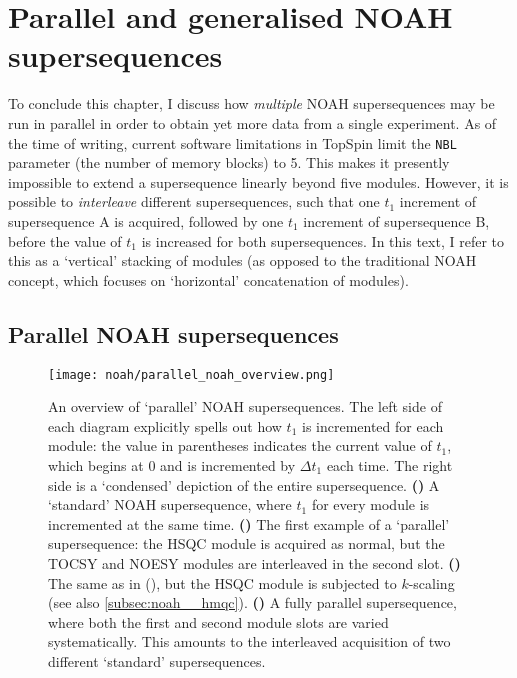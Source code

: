 \section{Parallel and generalised NOAH supersequences}
\label{sec:noah__parallel}

To conclude this chapter, I discuss how \textit{multiple} NOAH supersequences may be run in parallel in order to obtain yet more data from a single experiment.
As of the time of writing, current software limitations in TopSpin limit the \texttt{NBL} parameter (the number of memory blocks) to 5.
This makes it presently impossible to extend a supersequence linearly beyond five modules.
However, it is possible to \textit{interleave} different supersequences, such that one $t_1$ increment of supersequence A is acquired, followed by one $t_1$ increment of supersequence B, before the value of $t_1$ is increased for both supersequences.
In this text, I refer to this as a `vertical' stacking of modules (as opposed to the traditional NOAH concept, which focuses on `horizontal' concatenation of modules).

\subsection{Parallel NOAH supersequences}

\begin{figure}[!htbp]
    \centering
    \texttt{[image: noah/parallel\_noah\_overview.png]}%
    {\label{fig:parallel_noah_overview_conv}}%
    {\label{fig:parallel_noah_overview_interleaved}}%
    {\label{fig:parallel_noah_overview_kscaled}}%
    {\label{fig:parallel_noah_overview_parallel}}%
    \caption[Overview of parallel NOAH supersequences]{
        An overview of `parallel' NOAH supersequences.
        The left side of each diagram explicitly spells out how $t_1$ is incremented for each module: the value in parentheses indicates the current value of $t_1$, which begins at 0 and is incremented by $\Delta t_1$ each time.
        The right side is a `condensed' depiction of the entire supersequence.
        \textbf{()} A `standard' NOAH supersequence, where $t_1$ for every module is incremented at the same time.
        \textbf{()} The first example of a `parallel' supersequence: the HSQC module is acquired as normal, but the TOCSY and NOESY modules are interleaved in the second slot.
        \textbf{()} The same as in (), but the HSQC module is subjected to $k$-scaling (see also \cref{subsec:noah__hmqc}).
        \textbf{()} A fully parallel supersequence, where both the first and second module slots are varied systematically.
        This amounts to the interleaved acquisition of two different `standard' supersequences.
    }
    \label{fig:parallel_noah_overview}
\end{figure}

